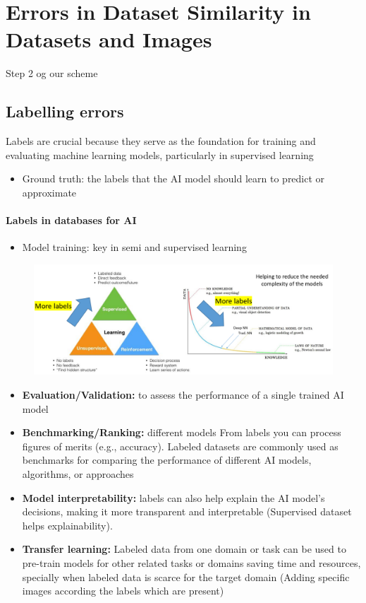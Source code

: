 \chapter{Errors in Dataset Similarity in Datasets and Images}
Step 2 og our scheme




\section{Labelling errors}
\noindent Labels are crucial because they serve as the foundation for training and evaluating machine learning models, particularly in supervised learning
\begin{itemize}
    \item Ground truth: the labels that the AI model should learn to predict or approximate
\end{itemize}

\subsubsection{Labels in databases for AI}
\begin{itemize}
    \item Model training: key in semi and supervised learning
\end{itemize}
\begin{figure}[H]
    \centering
    \includegraphics[width=0.8\linewidth]{09-10/images/labels.png}
\end{figure}

\begin{itemize}
    \item \textbf{Evaluation/Validation:} to assess the performance of a single trained AI model
    \item \textbf{Benchmarking/Ranking:} different models From labels you can process figures of merits (e.g., accuracy). Labeled datasets are commonly used as benchmarks for comparing the performance of different AI models, algorithms, or approaches
    \item \textbf{Model interpretability:} labels can also help explain the AI model's decisions, making it more transparent and interpretable (Supervised dataset helps explainability).
    \item \textbf{Transfer learning:}  Labeled data from one domain or task can be used to pre-train models for other related tasks or domains saving time and resources, specially when labeled data is scarce for the target domain (Adding specific images according the labels which are present)
\end{itemize}

